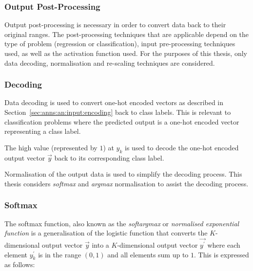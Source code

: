 \subsubsection{Output Post-Processing}
\label{sec:anns:an:output:output_post_processing}

Output post-processing is necessary in order to convert data back to their
original ranges. The post-processing techniques that are applicable depend on
the type of problem (regression or classification), input pre-processing
techniques used, as well as the activation function
used. For the purposes of this thesis, only data decoding, normalisation and
re-scaling techniques are considered.


\subsubsection{Decoding}
\label{sec:anns:an:output:decoding}

Data decoding is used to convert one-hot encoded vectors
as described in Section~\ref{sec:anns:an:input:encoding} back to class labels.
This is relevant to classification problems where the predicted output is a
one-hot encoded vector representing a class label.

The high value (represented by $1$) at $y_k$ is used to decode the
one-hot encoded output vector $\vec{y}$ back to its
corresponding class label.

Normalisation of the output data is used to simplify the decoding process. This
thesis considers \textit{softmax} and
\textit{argmax} normalisation to assist the decoding process.


\subsubsection{Softmax}
\label{sec:anns:an:output:softmax}

The softmax function, also known as the
\textit{softargmax} \cite[p.~184]{ref:goodfellow:2016} or
\textit{normalised exponential function}
\cite{ref:bishop:2006} is a generalisation of the logistic function that
converts the $K$-dimensional output vector $\vec{y}$ into a $K$-dimensional
output vector $\vec{y^{'}}$ where each element $y^{'}_k$ is in the range $(0,1)$
and all elements sum up to $1$. This is expressed as follows:

